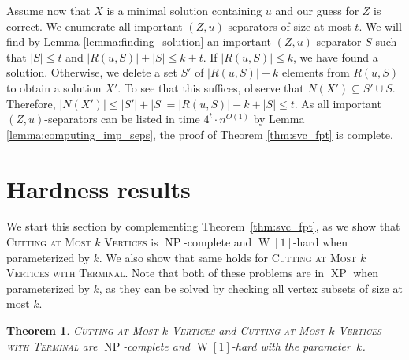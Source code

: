 \documentclass[a4paper,11pt]{article}
\newtheorem{theorem}{Theorem}
\theoremstyle{definition}
\theoremstyle{remark}
\newcommand{\card}[1]{\left\lvert {#1} \right\rvert}
\DeclareMathOperator{\operatorClassNP}{NP}
\newcommand{\classNP}{\ensuremath{\operatorClassNP}}
\DeclareMathOperator{\operatorClassW}{W}
\newcommand{\classW}[1]{\ensuremath{\operatorClassW[#1]}}
\DeclareMathOperator{\operatorClassXP}{XP}
\newcommand{\classXP}{\ensuremath{\operatorClassXP}}
\begin{document}
Assume now that $X$ is a minimal solution containing $u$ and our guess for $Z$ is correct. We enumerate all important $(Z,u)$-separators of size at most $t$. We will find by Lemma \ref{lemma:finding_solution} an important $(Z,u)$-separator $S$ such that $\card{S} \le t$ and $\card{R(u,S)} + \card{S} \le k + t$. If $\card{R(u,S)} \le k$, we have found a solution.
Otherwise, we delete a set $S'$ of $\card{R(u,S)}-k$ elements from $R(u,S)$ to obtain a solution $X'$. To see that this suffices, observe that $N(X')\subseteq S'\cup S$. Therefore, $\card{N(X')}\leq \card{S'}+\card{S}=\card{R(u,S)}-k+\card{S} \leq t$. 
As all important $(Z,u)$-separators can be listed in time $4^t\cdot n^{O(1)}$ by Lemma \ref{lemma:computing_imp_seps}, the proof of Theorem \ref{thm:svc_fpt} is complete.









\section{Hardness results}
We start this section by complementing Theorem~\ref{thm:svc_fpt}, as we show that \textsc{Cutting at Most  $k$ Vertices} is \classNP-complete and \classW{1}-hard when parameterized by $k$. We also show that same holds for
\textsc{Cutting at Most  $k$ Vertices with Terminal}. Note that both of these problems are in \classXP{} when parameterized by $k$, as they can be solved by checking all vertex subsets of size at most $k$.

\begin{theorem}\label{thm:svc_is_hard}
\textsc{Cutting at Most  $k$ Vertices} and \textsc{Cutting at Most  $k$ Vertices with Terminal} are \classNP-complete and \classW{1}-hard with the parameter~$k$.
\end{theorem}
\end{document}
